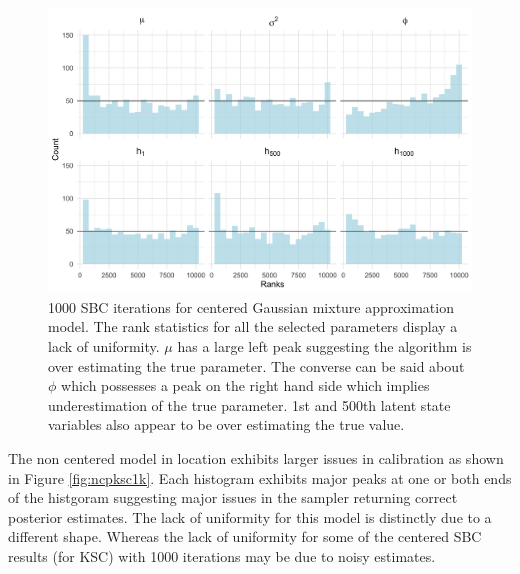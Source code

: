 \documentclass[12pt, a4paper]{article}
\begin{document}
    \begin{figure}[H]
        \centering
        \includegraphics[scale=0.1]{results/ksc_cp_1k.png}
        \caption{1000 SBC iterations for centered Gaussian mixture approximation model. The rank statistics for all the selected parameters display a lack of uniformity. $\mu$ has a large left peak suggesting the algorithm is over estimating the true parameter. The converse can be said about $\phi$ which possesses a peak on the right hand side which implies underestimation of the true parameter. 1st and 500th latent state variables also appear to be over estimating the true value.}
        \label{fig:cpksc1k}
    \end{figure}

    The non centered model in location exhibits larger issues in calibration as shown in Figure \ref{fig:ncpksc1k}. Each histogram exhibits major peaks at one or both ends of the histgoram suggesting major issues in the sampler returning correct posterior estimates. The lack of uniformity for this model is distinctly due to a different shape. Whereas the lack of uniformity for some of the centered SBC results (for KSC) with 1000 iterations may be due to noisy estimates. 
\end{document}
